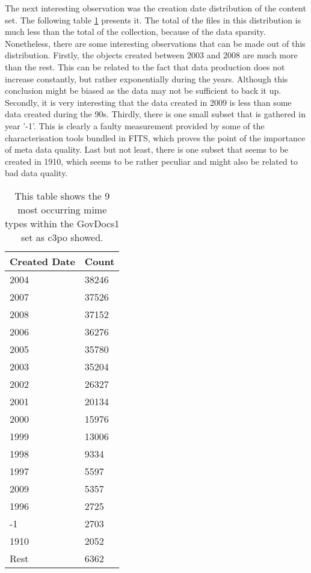 The next interesting observation was the creation date distribution of the content set. The following table \ref{tab:govdocs1_created} presents it. The total of the files in this distribution is much less than the total of the collection, because of the data sparsity. Nonetheless, there are some interesting observations that can be made out of this distribution. Firstly, the objects created between 2003 and 2008 are much more than the rest. This can be related to the fact that data production does not increase constantly, but rather exponentially during the years. Although this conclusion might be biased as the data may not be sufficient to back it up. Secondly, it is very interesting that the data created in 2009 is  less than some data created during the 90s. Thirdly, there is one small subset that is gathered in year '-1'. This is clearly a faulty measurement provided by some of the characterisation tools bundled in FITS, which proves the point of the importance of meta data quality. 
Last but not least, there is one subset that seems to be created in 1910, which seems to be rather peculiar and might also be related to bad data quality.

\begin{table}[h]
\centering
\begin{tabular}{l || l }
\hline
Created Date & Count \\
\hline
\hline
2004 	& 38246 \\
2007 	&  37526 \\
2008		&  37152 \\
2006 	&  36276 \\
2005		&  35780 \\
2003		&  35204 \\
2002		&  26327 \\
2001		&  20134 \\
2000		& 15976 \\
1999		& 13006 \\
1998		&  9334 \\
1997		&  5597 \\
2009		&  5357\\
1996		&  2725\\
-1		&  2703\\
1910		&  2052\\
Rest		&  6362\\
 \hline
\end{tabular}
\caption{This table shows the 9 most occurring mime types within the GovDocs1 set as c3po showed.}
\label{tab:govdocs1_created}
\end{table}

